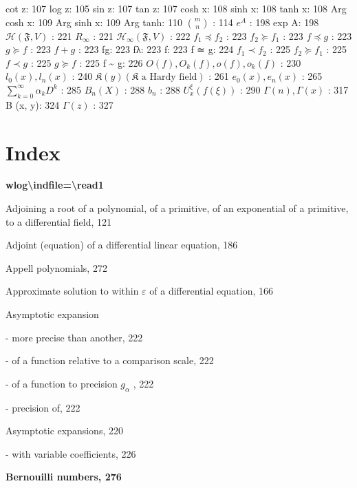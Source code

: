 cot z: 107 log z: 105 sin z: 107 tan z: 107 cosh x: 108 sinh x: 108 tanh x: 108 Arg cosh x: 109 Arg sinh x: 109 Arg tanh: 110 \(\binom{m}{n}\) : 114 \(e^{A}\) : 198 exp A: 198 \(\mathcal{H}(\mathfrak{F}, V)\) : 221 \(R_{\infty}\) : 221 \(\mathcal{H}_{\infty}(\mathfrak{F}, V)\) : 222 \(f_{1} \preccurlyeq f_{2}\) : 223 \(f_{2} \succcurlyeq f_{1}\) : 223 \(f \preccurlyeq g\) : 223 \(g \succcurlyeq f\) : 223 \(f + g\) : 223 fg: 223 fλ: 223 \textbar\textbar f\textbar\textbar: 223 f ≃ g: 224 \(f_{1} \prec f_{2}\) : 225 \(f_{2} \succcurlyeq f_{1}\) : 225 \(f \prec g\) : 225 \(g \succcurlyeq f\) : 225 f \textasciitilde{} g: 226 \(O(f), O_{k}(f), o(f), o_{k}(f)\) : 230 \(l_{0}(x), l_{n}(x)\) : 240 \(\mathfrak{K}(y) (\mathfrak{K} \text{ a Hardy field})\) : 261 \(e_{0}(x), e_{n}(x)\) : 265 \(\sum_{k=0}^{\infty} \alpha_{k} D^{k}\) : 285 \(B_{n}(X)\) : 288 \(b_{n}\) : 288 \(U_{x}^{\xi}(f(\xi))\) : 290 \(\Gamma(n), \Gamma(x)\) : 317 B (x, y): 324 \(\Gamma(z)\) : 327

\chapter*{Index}
{}

\par\noindent\textbf{\texorpdfstring{wlog\textbackslash indfile=\textbackslash read1}{wlog=}}\par

Adjoining a root of a polynomial, of a primitive, of an exponential of a primitive, to a differential field, 121

Adjoint (equation) of a differential linear equation, 186

Appell polynomials, 272

Approximate solution to within \(\varepsilon\) of a differential equation, 166

Asymptotic expansion

- more precise than another, 222

- of a function relative to a comparison scale, 222

- of a function to precision \(g_{\alpha}\) , 222

- precision of, 222

Asymptotic expansions, 220

- with variable coefficients, 226

\par\noindent\textbf{Bernouilli numbers, 276}\par

